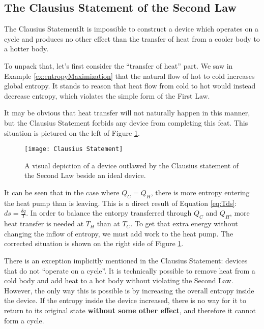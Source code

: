 \subsection{The Clausius Statement of the Second Law}
\begin{quoteWithTitle}{The Clausius Statement}{It is impossible to construct a device which operates on a cycle and produces no other effect than the transfer of heat from a cooler body to a hotter body.}
\end{quoteWithTitle}

To unpack that, let's first consider the ``transfer of heat'' part.  We saw in Example \ref{ex:entropyMaximization} that the natural flow of hot to cold increases global entropy.  It stands to reason that heat flow from cold to hot would instead decrease entropy, which violates the simple form of the First Law.

It may be obvious that heat transfer will not naturally happen in this manner, but the Clausius Statement forbids any device from completing this feat.  This situation is pictured on the left of Figure \ref{fig:clausiusViolator}.

\begin{figure}[H]
  \centering
  \texttt{[image: Clausius Statement]}
  \caption{A visual depiction of a device outlawed by the Clausius statement of the Second Law beside an ideal device.}
  \label{fig:clausiusViolator}
\end{figure}

It can be seen that in the case where $Q_C = Q_H$, there is more entropy entering the heat pump than is leaving.  This is a direct result of Equation \ref{eq:Tds}: $ds = \frac{\delta q}{T}$.  In order to balance the entorpy transferred through $Q_C$ and $Q_H$, more heat transfer is needed at $T_H$ than at $T_C$.  To get that extra energy without changing the inflow of entropy, we must add work to the heat pump.  The corrected situation is shown on the right side of Figure \ref{fig:clausiusViolator}.

There is an exception implicitly mentioned in the Clausius Statement: devices that do not ``operate on a cycle''.  It is technically possible to remove heat from a cold body and add heat to a hot body without violating the Second Law.  However, the only way this is possible is by increasing the overall entropy inside the device.  If the entropy inside the device increased, there is no way for it to return to its original state {\bf without some other effect}, and therefore it cannot form a cycle.

